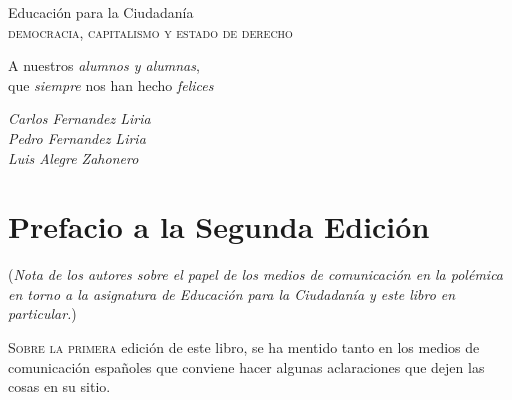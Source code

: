 \documentclass[draft,9pt,letterpaper,twocolumn,openany]{extbook}
\newcommand*\initfamily{\usefont{U}{Zallman}{xl}{n}}
\newcommand{\dcap}[2]{
	 \lettrine[nindent=0em,findent=2pt,lines=3,loversize=-0.10]{\initfamily #1}{#2}
 }
\begin{document}
	\begin{titlepage}
		\begin{center}
		\Huge {}\hspace{.2em} Educación para la Ciudadanía \hspace{.2em} \\
		\textsc{\large democracia, capitalismo y estado de derecho}
		\end{center}
	\vfill
		\begin{center}\LARGE{}\selectfont
			A nuestros {\itshape alumnos y alumnas},\\ que {\itshape siempre} nos han hecho {\itshape felices}
		\end{center}
	\vfill
		\begin{center}
		\textit{Carlos Fernandez Liria} \\ \textit{Pedro Fernandez Liria} \\ \textit{Luis Alegre Zahonero}
		\end{center}
	
	\end{titlepage}
\chapter*{ Prefacio a la Segunda Edición }
\begin{center}
	\begin{minipage}{.5\linewidth}\small
	(\emph{Nota de los autores sobre el papel de los medios de comunicación en la polémica
		en torno a la asignatura de Educación para la Ciudadanía y este libro en particular.})
	\end{minipage}
\end{center}
\dcap{S}{obre la primera} edición de este libro, se ha mentido tanto en los medios de
comunicación españoles que conviene hacer algunas aclaraciones que dejen las
cosas en su sitio. 
\end{document}

